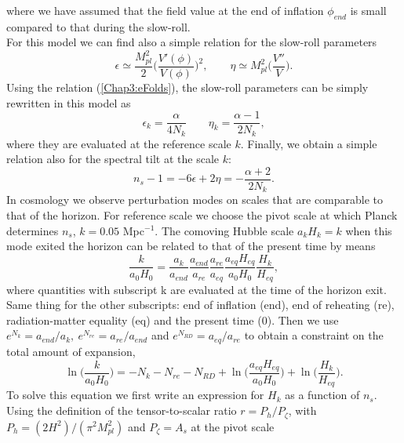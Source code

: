 \documentclass[11pt,a4paper,twoside]{book}
\begin{document}
where we have assumed that the field value at the end of inflation $\phi_{end}$ is small compared to that during the slow-roll. \\
For this model we can find also a simple relation for the slow-roll parameters
\begin{equation}
	\label{Chap3:slowRollParameters}
	\epsilon \simeq \frac{M_{pl}^{2}}{2}\Bigg(\frac{V'(\phi)}{V(\phi)}\Bigg)^{2},
	\qquad
	\eta \simeq M_{pl}^{2}\Bigg(\frac{V''}{V}\Bigg).
\end{equation}
Using the relation (\ref{Chap3:eFolds}), the slow-roll parameters can be simply rewritten in this model as
\begin{equation}
	\label{Chap3:slowRollParameters2}
	\epsilon_{k} = \frac{\alpha}{4N_{k}}
	\qquad
	\eta_{k}=\frac{\alpha-1}{2N_{k}},
\end{equation}
where they are evaluated at the reference scale $ k $. Finally, we obtain a simple relation also for the spectral tilt at the scale $ k $:
\begin{equation}
	\label{Chap3:spectralTilt}
	n_{s}-1=-6\epsilon + 2\eta = -\frac{\alpha + 2}{2N_{k}}.
\end{equation}
In cosmology we observe perturbation modes on scales that are comparable to that of the horizon. For reference scale we choose the pivot scale at which Planck determines $ n_{s} $, $ k=0.05 $ Mpc$ ^{-1} $. The comoving Hubble scale $ a_{k}H_{k}=k $ when this mode exited the horizon can be related to that of the present time by means
\begin{equation}
\label{Chap3:relationBetweenScales}
\frac{k}{a_{0}H_{0}} = \frac{a_{k}}{a_{end}}\frac{a_{end}}{a_{re}}\frac{a_{re}}{a_{eq}}\frac{a_{eq}H_{eq}}{a_{0}H_{0}}\frac{H_{k}}{H_{eq}},
\end{equation} 
where quantities with subscript k are evaluated at the time of the horizon exit. Same thing for the other subscripts: end of inflation (end), end of reheating (re), radiation-matter equality (eq) and the present time (0). Then we use $ e^{N_{k}}=a_{end}/a_{k},\ e^{N_{re}}=a_{re}/a_{end}  $ and $ e^{N_{RD}}=a_{eq}/a_{re} $ to obtain a constraint on the total amount of expansion,
\begin{equation}
	\label{Chap3:relationBetweenScales2}
	\ln \Bigg(\frac{k}{a_{0}H_{0}}\Bigg) = -N_{k} - N_{re} - N_{RD} + \ln \Bigg(\frac{a_{eq}H_{eq}}{a_{0}H_{0}}\Bigg) + \ln \Bigg(\frac{H_{k}}{H_{eq}}\Bigg).   
\end{equation}
To solve this equation we first  write an expression for $ H_{k} $ as a function of $ n_{s} $. Using the definition of the tensor-to-scalar ratio $ r= P_{h}/P_{\zeta} $, with $ P_{h}=(2H^{2})/(\pi^{2}M_{pl}^{2}) $ and $ P_{\zeta} = A_{s} $ at the pivot scale 
\end{document}
